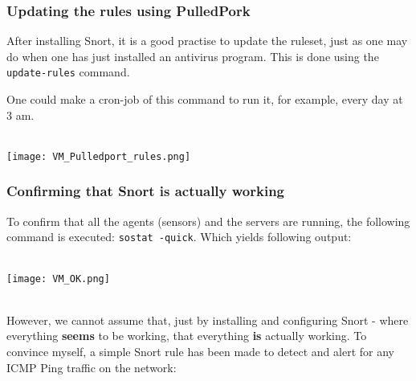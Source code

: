 \subsubsection{Updating the rules using PulledPork}

After installing Snort, it is a good practise to update the ruleset, just as one may do when one has just installed an antivirus program. This is done using the \texttt{update-rules} command.

One could make a cron-job of this command to run it, for example, every day at 3 am.
$\;$ \\ \\
\noindent\begin{minipage}{\textwidth}
    \centering
    \texttt{[image: VM\_Pulledport\_rules.png]}
\label{fig:network}
\end{minipage}

\subsubsection{Confirming that Snort is actually working}

To confirm that all the agents (sensors) and the servers are running, the following command is executed: \texttt{sostat -quick}. Which yields following output:
$\;$ \\ \\
\noindent\begin{minipage}{\textwidth}
    \centering
    \texttt{[image: VM\_OK.png]}
\label{fig:network}
\end{minipage}
$\;$ \\ \\
However, we cannot assume that, just by installing and configuring Snort - where everything \textbf{seems} to be working, that everything \textbf{is} actually working. To convince myself, a simple Snort rule has been made to detect and alert for any ICMP Ping traffic on the network: \\

